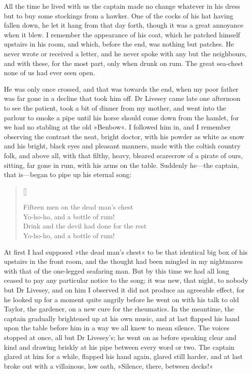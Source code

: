 All the time he lived with us the captain made no change what\-ever in his dress but to buy some stockings from a hawker. One of the cocks of his hat having fallen down, he let it hang from that day forth, though it was a great annoyance when it blew. I remember the appearance of his coat, which he patched himself upstairs in his room, and which, before the end, was nothing but patches. He never wrote or received a letter, and he never spoke with any but the neighbours, and with these, for the most part, only when drunk on rum. The great sea-chest none of us had ever seen open.

He was only once crossed, and that was towards the end, when my poor father was far gone in a decline that took him off. Dr Livesey came late one afternoon to see the patient, took a bit of dinner from my mother, and went into the parlour to smoke a pipe until his horse should come down from the hamlet, for we had no stabling at the old »Benbow«. I followed him in, and I remember observing the contrast the neat, bright doctor, with his powder as white as snow and his bright, black eyes and pleasant manners, made with the coltish country folk, and above all, with that filthy, heavy, bleared scarecrow of a pirate of ours, sitting, far gone in rum, with his arms on the table. Suddenly he—the captain, that is—began to pipe up his eternal song:

\settowidth{\versewidth}{Drink and the devil had done for the rest\longdash}
\begin{verse}[\versewidth]
\begin{altverse}
Fifteen men on the dead man’s chest\longdash\\
Yo-ho-ho, and a bottle of rum!\\
Drink and the devil had done for the rest\longdash\\
Yo-ho-ho, and a bottle of rum!
\end{altverse}
\end{verse}

At first I had supposed »the dead man's chest« to be that identical big box of his upstairs in the front room, and the thought had been mingled in my nightmares with that of the one-legged seafaring man. But by this time we had all long ceased to pay any particular notice to the song; it was new, that night, to nobody but Dr Livesey, and on him I observed it did not produce an agreeable effect, for he looked up for a moment quite angrily before he went on with his talk to old Taylor, the gardener, on a new cure for the rheumatics. In the meantime, the captain gradually brightened up at his own music, and at last flapped his hand upon the table before him in a way we all knew to mean silence. The voices stopped at once, all but Dr Livesey's; he went on as before speaking clear and kind and drawing briskly at his pipe between every word or two. The captain glared at him for a while, flapped his hand again, glared still harder, and at last broke out with a villainous, low oath, »Silence, there, between decks!«

